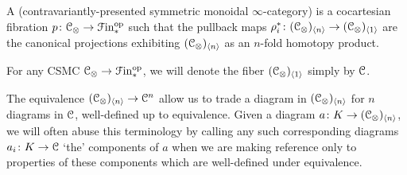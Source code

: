 \documentclass[main.tex]{subfiles}
\begin{document}
\begin{definition}
  A  (contravariantly-presented symmetric monoidal $\infty$-category) is a cocartesian fibration $p\colon \mathcal{C}_{\otimes} \to \mathcal{F}\mathrm{in}_{*}^{\mathrm{op}}$ such that the pullback maps $\rho_{i}^{*}\colon (\mathcal{C}_{ \otimes})_{\langle n \rangle} \to (\mathcal{C}_{ \otimes})_{\langle 1 \rangle}$ are the canonical projections exhibiting $(\mathcal{C}_{ \otimes})_{\langle n \rangle}$ as an $n$-fold homotopy product.
\end{definition}

\begin{notation}
  For any CSMC $\mathcal{C}_{\otimes} \to \mathcal{F}\mathrm{in}_{*}^{\mathrm{op}}$, we will denote the fiber $(\mathcal{C}_{\otimes})_{\langle 1 \rangle}$ simply by $\mathcal{C}$.
\end{notation}

The equivalence $(\mathcal{C}_{\otimes})_{\langle n \rangle} \to \mathcal{C}^{n}$ allow us to trade a diagram in $(\mathcal{C}_{\otimes})_{\langle n \rangle}$ for $n$ diagrams in $\mathcal{C}$, well-defined up to equivalence. Given a diagram $a\colon K \to (\mathcal{C}_{\otimes})_{\langle n \rangle}$, we will often abuse this terminology by calling any such corresponding diagrams $a_{i}\colon K \to \mathcal{C}$ `the' components of $a$ when we are making reference only to properties of these components which are well-defined under equivalence.
\end{document}
